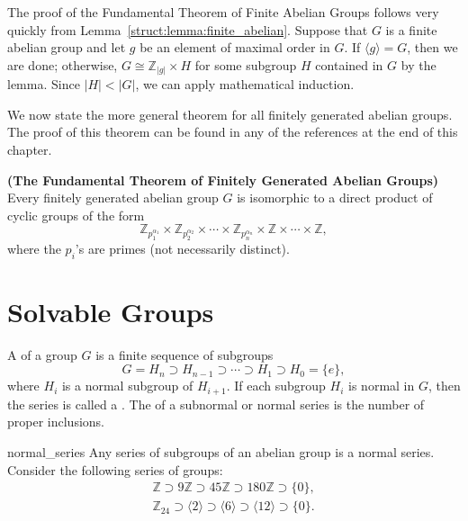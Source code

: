 \medskip


The proof of the Fundamental Theorem of Finite Abelian Groups follows
very quickly from Lemma~\ref{struct:lemma:finite_abelian}.  Suppose that $G$ is a finite abelian
group and let $g$ be an element of maximal order in $G$. If $\langle g
\rangle = G$, then we are done; otherwise, $G \cong {\mathbb Z}_{|g|}
\times H$ for some subgroup $H$ contained in $G$ by the lemma.  Since
$|H| < |G|$, we can apply mathematical induction.  
 
 
We now state the more general theorem for all finitely generated
abelian groups.  The proof of this theorem can be found in any of the 
references at the end of this chapter.
 
 
\begin{theorem}
\textbf{(The Fundamental Theorem of Finitely Generated Abelian Groups)}
Every finitely generated abelian group $G$ is isomorphic to a direct
product of cyclic groups of the form 
\[
{\mathbb Z}_{p_1^{ \alpha_1 }}
\times
{\mathbb Z}_{p_2^{ \alpha_2 }}
\times
\cdots
\times
{\mathbb Z}_{p_n^{ \alpha_n }}
\times
{\mathbb Z}
\times \cdots \times
{\mathbb Z},
\]
where the $p_i$'s are primes (not necessarily distinct).
\end{theorem}

 
\section{Solvable Groups}

A  
of a group $G$ is a finite sequence of subgroups 
\[
G = H_n \supset H_{n-1} \supset \cdots \supset H_1 \supset
H_0 = \{ e \},
\]
where $H_i$ is a normal subgroup of $H_{i+1}$. If each subgroup $H_i$
is normal in $G$, then the series is called a . The  of a 
subnormal or normal series is the number of proper inclusions. 
 

\begin{example}{normal_series}
Any series of subgroups of an abelian group is a normal series.
Consider the following  series of groups: 
\begin{gather*}
{\mathbb Z} \supset 9{\mathbb Z} \supset 45{\mathbb Z} \supset 180{\mathbb Z} 
\supset \{0\}, \\
{\mathbb Z}_{24} \supset \langle 2 \rangle \supset \langle 6 \rangle 
\supset \langle 12 \rangle
\supset \{0\}.
\end{gather*}
\end{example}
 

